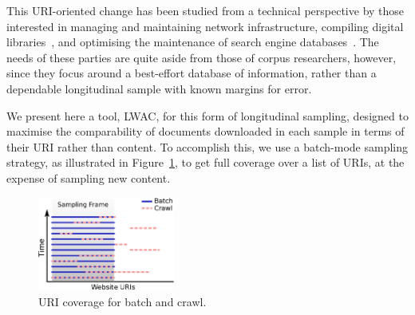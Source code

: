 \documentclass[11pt]{article}
\newcommand{\toolname}{LWAC}
\begin{document}
This URI-oriented change has been studied from a technical perspective by those interested in managing and maintaining network infrastructure, compiling digital libraries~\cite{tyler2003librarians}, and optimising the maintenance of search engine databases~\cite{koehler2004longitudinal}.  The needs of these parties are quite aside from those of corpus researchers, however, since they focus around a best-effort database of information, rather than a dependable longitudinal sample with known margins for error.
% 
% 


We present here a tool, \toolname, for this form of longitudinal sampling, designed to maximise the comparability of documents downloaded in each sample in terms of their URI rather than content.  To accomplish this, we use a batch-mode sampling strategy, as illustrated in Figure~\ref{fig:sampling}, to get full coverage over a list of URIs, at the expense of sampling new content.

\begin{figure}[h]
\centering
\includegraphics[width=0.4\textwidth]{images/samples.eps}
\caption{URI coverage for batch and crawl.}
\label{fig:sampling}
\end{figure}
\end{document}
